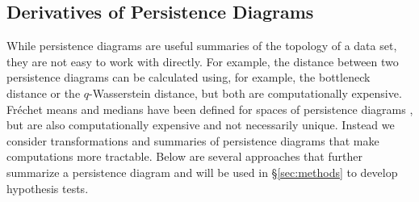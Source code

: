 \documentclass[12pt]{article}
\newcommand{\brittany}[1]{{\color{cyan} Brittany says: #1}}
\newcommand{\figref}[1]{Figure~\ref{#1}}
\def\R{{\mathbb R}}
\begin{document}
%

\subsection{Derivatives of Persistence Diagrams} \label{sec:derivatives}
While persistence diagrams are useful summaries of the topology of a data set, they are not easy to work with directly.
For example, the distance between two persistence diagrams can be calculated using, for example,  the bottleneck distance or the $q$-Wasserstein distance, but both are computationally expensive.
Fr\'echet means and medians have been defined for spaces of persistence diagrams \citep{Turner:2014kq}, but are also computationally expensive and not necessarily unique.  Instead we consider transformations and summaries of persistence diagrams that make computations more tractable.
Below are several approaches that further summarize a persistence diagram and will be used in \S \ref{sec:methods} to develop hypothesis tests.
\end{document}
